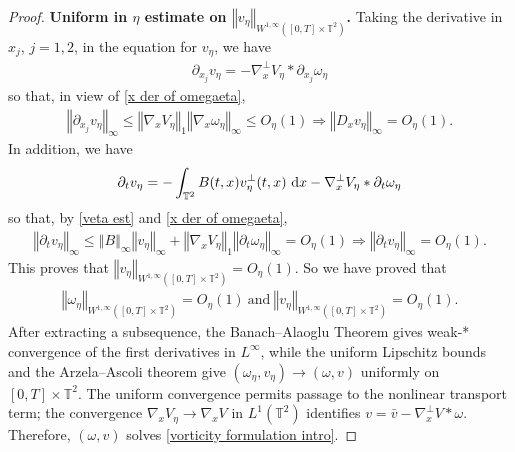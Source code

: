\documentclass[11pt,reqno]{amsart}
\numberwithin{equation}{section}
\def\dd{{\rm d}}
\begin{document}
\begin{proof}
\smallskip
\textbf{Uniform in $\eta$ estimate on $\left\Vert v_{\eta}\right\Vert_{W^{1,\infty}([0,T]\times \mathbb{T}^{2})}$.} Taking the derivative in $x_{j}$, $j=1,2$, in the equation for $v_{\eta}$,
we have
\begin{align*}
\partial_{x_{j}}v_{\eta}=-\nabla_{x}^{\perp}V_{\eta}\ast \partial_{x_{j}}\omega_{\eta}    
\end{align*} 
so that, in view of \eqref{x der of omegaeta}, 
\begin{align*}
\left\Vert \partial_{x_{j}}v_{\eta}\right\Vert_{\infty}\leq \left\Vert\nabla_xV_\eta\right\Vert_1\left\Vert \nabla_{x}\omega_{\eta}\right\Vert_{\infty}\leq O_{\eta}(1)\Rightarrow\left\Vert D_{x}v_{\eta}\right\Vert_{\infty}=O_{\eta}(1).        
\end{align*}
In addition, we have 
\begin{align*}
\partial_{t}v_{\eta}=-\int_{\mathbb{T}^{2}}B(t,x)v^{\perp}_{\eta}(t,x)\ \dd x-\nabla_{x}^{\perp}V_{\eta}\ast \partial_{t}\omega_{\eta}   \end{align*} 
so that, by \eqref{veta est} and \eqref{x der of omegaeta},
\begin{align*}
\left\Vert \partial_{t}v_{\eta}\right\Vert_{\infty}\leq \left\Vert B\right\Vert_{\infty}\left\Vert v_{\eta}\right\Vert_{\infty}+\left\Vert\nabla_xV_\eta\right\Vert_1\left\Vert \partial_{t}\omega_{\eta}\right\Vert_{\infty}=O_{\eta}(1)\Rightarrow \left\Vert \partial_{t}v_{\eta}\right\Vert_{\infty}=O_{\eta}(1).  \end{align*}
This proves that $\left\Vert v_{\eta}\right\Vert_{W^{1,\infty}([0,T]\times \mathbb{T}^{2})}=O_{\eta}(1)$. 
So we have proved that 
\begin{align*}
 \left\Vert \omega_{\eta}\right\Vert_{W^{1,\infty}([0,T]\times \mathbb{T}^{2})}=O_{\eta}(1)\ \mbox{and}\  \left\Vert v_{\eta}\right\Vert_{W^{1,\infty}([0,T]\times \mathbb{T}^{2})}=O_{\eta}(1). 
 \end{align*}
 After extracting a subsequence, the Banach--Alaoglu Theorem gives weak-* convergence 
 of the first derivatives in $L^\infty$, while the uniform Lipschitz bounds 
 and the Arzela--Ascoli theorem give $(\omega_\eta,v_\eta)\to(\omega,v)$ uniformly on 
 $[0,T]\times\mathbb T^2$. 
 The uniform convergence permits passage to the nonlinear transport term; 
 the convergence $\nabla_xV_\eta\to\nabla_xV$ in $L^1(\mathbb T^2)$ identifies $v=\bar{v}-\nabla_x^\perp V*\omega$. 
 Therefore, $(\omega,v)$ solves \eqref{vorticity formulation intro}.


\end{proof}
\end{document}
